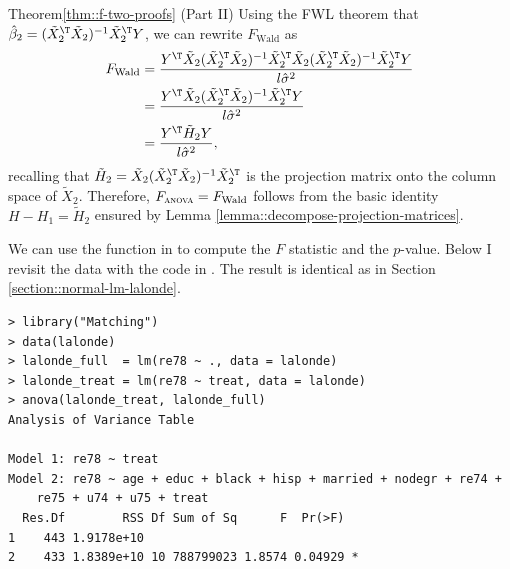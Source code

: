 \begin{myproof}{Theorem}{\ref{thm::f-two-proofs} (Part II)}
Using the FWL theorem that $\hat{\beta}_{2}=(\tilde{X}_{2}^{\T}\tilde{X}_{2})^{-1}\tilde{X}_{2}^{\T}Y$,
we can rewrite $F_\text{Wald} $ as 
\begin{align}
F_\text{Wald} & =\frac{Y^{\T}\tilde{X}_{2}(\tilde{X}_{2}^{\T}\tilde{X}_{2})^{-1}\tilde{X}_{2}^{\T}\tilde{X}_{2}(\tilde{X}_{2}^{\T}\tilde{X}_{2})^{-1}\tilde{X}_{2}^{\T}Y}{l\hat{\sigma}^{2}}\nonumber \\
 & =\frac{Y^{\T}\tilde{X}_{2}(\tilde{X}_{2}^{\T}\tilde{X}_{2})^{-1}\tilde{X}_{2}^{\T}Y}{l\hat{\sigma}^{2}}\nonumber \\
 & =\frac{Y^{\T}\tilde{H}_{2}Y}{l\hat{\sigma}^{2}},\label{eq:Wformula}
\end{align}
recalling that  
$
\tilde{H}_{2}=\tilde{X}_{2}(\tilde{X}_{2}^{\T}\tilde{X}_{2})^{-1}\tilde{X}_{2}^{\T}
$
is the projection matrix onto the column space of $\tilde{X}_{2}.$ Therefore, $F_\textsc{anova}  = F_\text{Wald}$ follows from the basic identity $H-H_{1}=\tilde{H}_{2}$ ensured by Lemma \ref{lemma::decompose-projection-matrices}. 
\end{myproof}
 
 
We can use the  function in  to compute the $F$ statistic and the $p$-value. Below I revisit the  data with the  code in .  The result is identical as in Section \ref{section::normal-lm-lalonde}. 


 \begin{lstlisting}
> library("Matching")
> data(lalonde)
> lalonde_full  = lm(re78 ~ ., data = lalonde)
> lalonde_treat = lm(re78 ~ treat, data = lalonde)
> anova(lalonde_treat, lalonde_full)
Analysis of Variance Table

Model 1: re78 ~ treat
Model 2: re78 ~ age + educ + black + hisp + married + nodegr + re74 + 
    re75 + u74 + u75 + treat
  Res.Df        RSS Df Sum of Sq      F  Pr(>F)  
1    443 1.9178e+10                              
2    433 1.8389e+10 10 788799023 1.8574 0.04929 *
\end{lstlisting}


